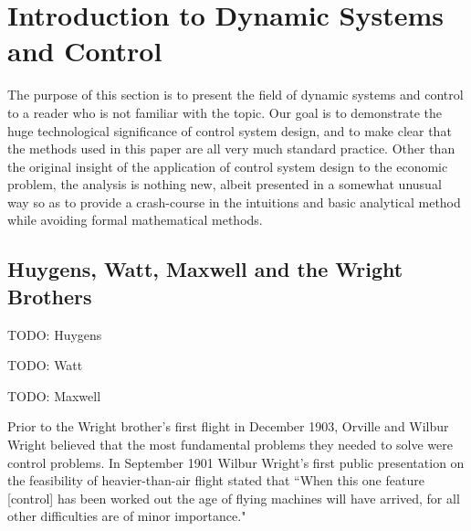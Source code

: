 \section{Introduction to Dynamic Systems and Control}
\label{section:dynamic_systems_and_control}

The purpose of this section is to present the field of dynamic systems and control to a reader who
is not familiar with the topic. Our goal is to demonstrate the huge technological significance of
control system design, and to make clear that the methods used in this paper are all very much
standard practice. Other than the original insight of the application of control system design to
the economic problem, the analysis is nothing new, albeit presented in a somewhat unusual way so as
to provide a crash-course in the intuitions and basic analytical method while avoiding formal
mathematical methods.

\subsection{Huygens, Watt, Maxwell and the Wright Brothers}

TODO: Huygens

TODO: Watt

TODO: Maxwell

Prior to the Wright brother's first flight in December 1903, Orville and Wilbur Wright believed that
the most fundamental problems they needed to solve were control problems. In September 1901 Wilbur
Wright's first public presentation on the feasibility of heavier-than-air flight stated that ``When
this one feature [control] has been worked out the age of flying machines will have arrived, for all
other difficulties are of minor importance."\cite{wright1908}


